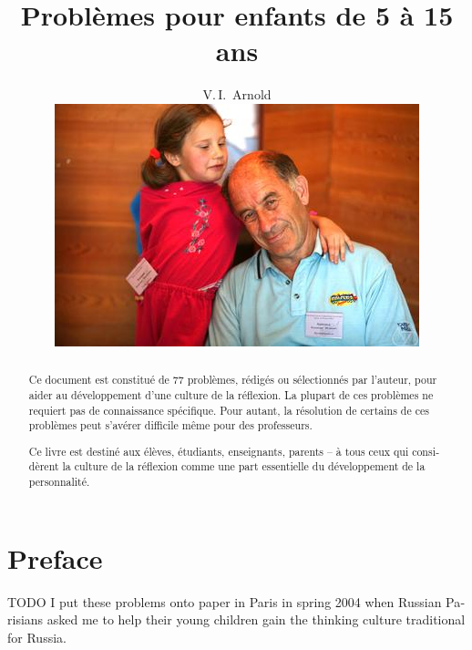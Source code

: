 
\setdefaultlanguage{french}

\title{Problèmes pour enfants de 5 à 15 ans}

\author{V.\,I.~Arnold
\vspace*{2cm}\\
\includegraphics[width=\linewidth]{resources/photo-arnold_small}
}
\date{}


\maketitle
\thispagestyle{empty}
\cleardoublepage
\setcounter{page}{1}
\begin{abstract}
Ce document est constitué de 77 problèmes, rédigés ou sélectionnés par l'auteur, pour aider au développement d'une culture de la réflexion.
La plupart de ces problèmes ne requiert pas de connaissance spécifique.
Pour autant, la résolution de certains de ces problèmes peut s'avérer difficile même pour des professeurs.

Ce livre est destiné aux élèves, étudiants, enseignants, parents -- à tous ceux qui considèrent la culture de la réflexion comme une part essentielle du développement de la personnalité.
\end{abstract}
\clearpage

\section*{Preface}
TODO
I put these problems onto paper in Paris in spring 2004 when Russian Parisians asked me to help
their young children gain the thinking culture traditional for Russia.

